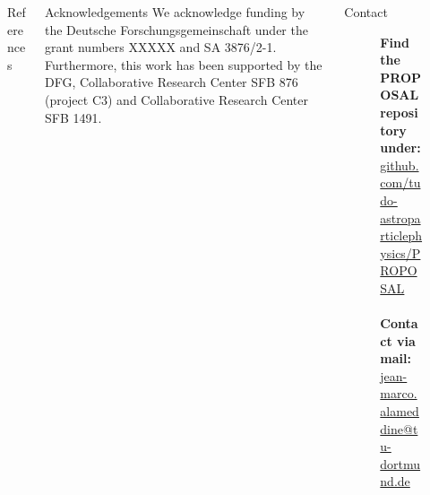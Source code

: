 \documentclass[t]{beamer}
\begin{document}
  \vspace*{\fill}
  \begin{columns}[onlytextwidth]%
    \begin{column}{0.38\linewidth}%
      \begin{block}[equal height group=bottom, fonttitle=\normalsize]{References}
        \begin{multicols}{3}
          \footnotesize%
          \printbibliography%
        \end{multicols}
      \end{block}
    \end{column}
    \begin{column}{0.24\linewidth}%
      \begin{block}[equal height group=bottom, fonttitle=\normalsize]{Acknowledgements}
          We acknowledge funding by the Deutsche Forschungsgemeinschaft under the grant numbers XXXXX and SA 3876/2-1.\\
          Furthermore, this work has been supported by the DFG, Collaborative Research Center SFB 876 (project C3) and Collaborative Research Center SFB 1491.
      \end{block}
    \end{column}
    \begin{column}{0.38\linewidth}%
      \begin{block}[equal height group=bottom, fonttitle=\normalsize]{Contact}
        \begin{center}
  \begin{figure}[ht]
  \begin{minipage}[ht]{0.75\linewidth}
  \textbf{Find the PROPOSAL repository under:}\\ \url{github.com/tudo-astroparticlephysics/PROPOSAL}\\
  \vspace{0.2em}\\
  \textbf{Contact via mail:}\\ \href{mailto:me@jean-marco.alameddine@tu-dortmund.de}{jean-marco.alameddine@tu-dortmund.de} 


\end{minipage}
\end{figure}
\end{center}
\end{block}
\end{column}
\end{columns}
\end{document}
